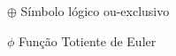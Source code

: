 \begin{simbolos}
  \item[$ \oplus $] Símbolo lógico ou-exclusivo
  \item[$ \phi $] Função Totiente de Euler
\end{simbolos}
